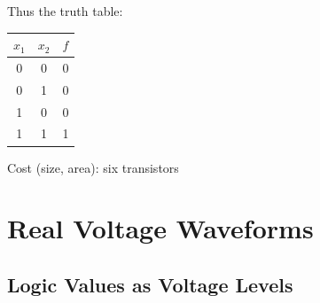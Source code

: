 \documentclass[12pt,openany, tikz,border=10pt]{book}
\begin{document}
        Thus the truth table:
        
        \begin{center}
            \begin{tabular}{cc|c}
                \hline
                \( x_1 \) & \( x_2 \) & \( f \) \\
                \hline
                0 & 0 & 0 \\
                0 & 1 & 0 \\
                1 & 0 & 0 \\
                1 & 1 & 1 \\
                \hline
            \end{tabular}
        \end{center}
        
         Cost (size, area): six transistors


\section{Real Voltage Waveforms}
\subsection{Logic Values as Voltage Levels}
\vspace*{5px}
\end{document}
